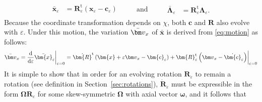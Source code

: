 \begin{equation}
\begin{aligned}
\bar{\bm{x}}_\varepsilon  &= \bm{R}^{\mathrm{t}}_\varepsilon \left(\bm{x}_\varepsilon - \bm{c}_\varepsilon \right) \\
\end{aligned}
\qquad\text{ and }\qquad
\begin{aligned}
\bar{\bm{\Lambda}}_\varepsilon &= \bm{R}^{\mathrm{t}}_\varepsilon\bm{\Lambda}_\varepsilon .
\end{aligned}
\label{eq:motion}
\end{equation}
Because the coordinate transformation %
depends on \(\chi\), 
both \(\bm{c}\) and \(\bm{R}\) also evolve with \(\varepsilon\).
Under this motion, the
variation \(\bar{\VarConfig}_x\) of \(\bar{\bm{x}}\) is derived from
\eqref{eq:motion} as follows: 
\begin{equation}
\begin{aligned}
\bar{\VarConfig}_x &= \frac{\mathrm{d}}{\mathrm{d}\varepsilon} \bar{\bm{x}}_\varepsilon \biggr|_{\varepsilon=0} %
= \dot{\bm{R}}^{\mathrm{t}}\left(\bm{x} + \varepsilon \VarConfig_x - \bm{c}_\varepsilon \right) + \bm{R}^{\mathrm{t}}_\varepsilon\left(\VarConfig_x - \dot{\bm{c}}_\varepsilon \right) \biggr|_{\varepsilon=0}  \\
\end{aligned}
\label{eq:isom-dxe}
\end{equation} 
It is simple to show that in order for an
evolving rotation \(\bm{R}_\varepsilon\) to remain a rotation (see
definition in Section~\ref{sec:rotations}), \(\dot{\bm{R}}_\varepsilon\) must
be expressible in the form \(\bm{\Omega R}_\varepsilon\) for some
skew-symmetric \(\bm{\Omega}\) with axial vector \(\bm{\omega}\), and it follows that 
